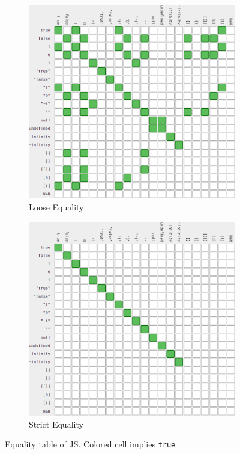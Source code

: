 \begin{figure}[htb]\vspace{10pt}\centering
    \begin{subfigure}{.45\textwidth}\centering
        \includegraphics[width=\textwidth]{images/basics-of-javascript/loose-equality.png}
        \caption{Loose Equality}
        \label{fig:loose-equality-table}
    \end{subfigure}
    \begin{subfigure}{.45\textwidth}\centering
        \includegraphics[width=\textwidth]{images/basics-of-javascript/strict-equality.png}
        \caption{Strict Equality}
        \label{fig:strict-equality-table}
    \end{subfigure}
    \caption{Equality table of JS. Colored cell implies \texttt{true}}
    \label{fig:comparison-table}
\end{figure}

